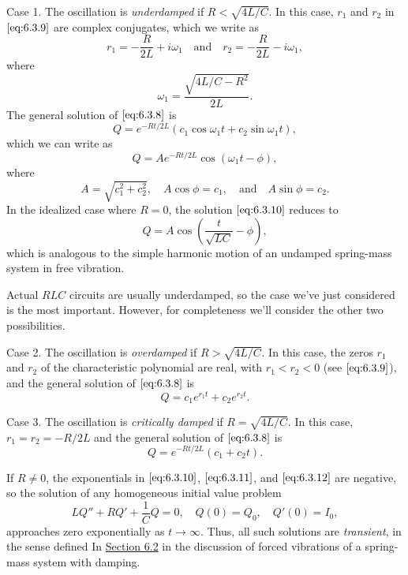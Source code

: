 \documentclass{ximera}
\begin{document}
Case 1.
The oscillation is \textit{underdamped} if $R<\sqrt{4L/C}$. In this
case, $r_1$ and $r_2$ in $\eqref{eq:6.3.9}$ are complex conjugates, which we
write as
$$
r_1=-\frac{R}{2L}+i\omega_1\quad\mbox{and}\quad r_2=-\frac{R}{2L}-i\omega_1,
$$
where
$$
\omega_1=\frac{\sqrt{4L/C-R^2}}{2L}.
$$
The general solution of  $\eqref{eq:6.3.8}$  is
$$
Q=e^{-Rt/2L}(c_1\cos\omega_1 t+c_2\sin\omega_1 t),
$$
which we can write as
\begin{equation}\label{eq:6.3.10}
Q=Ae^{-Rt/2L}\cos(\omega_1 t-\phi),
\end{equation}
 where
$$
A=\sqrt{c_1^2+c_2^2},\quad A\cos\phi=c_1,\quad\mbox{and}\quad A\sin\phi=c_2.
$$
In the idealized case where $R=0$, the solution $\eqref{eq:6.3.10}$
reduces to
$$
Q=A\cos\left(\frac{t}{\sqrt{LC}}-\phi\right),
$$
which is analogous to  the simple harmonic motion of an undamped
spring-mass system in free vibration.

Actual $RLC$ circuits are usually underdamped, so the case we've just
considered is the most important. However, for completeness we'll
consider the other two possibilities.

Case 2.
The oscillation is \textit{overdamped} if $R>\sqrt{4L/C}$. In this case,
the zeros $r_1$ and $r_2$ of the characteristic polynomial are real,
with $r_1<r_2<0$ (see $\eqref{eq:6.3.9}$), and the general solution of
$\eqref{eq:6.3.8}$ is
\begin{equation}\label{eq:6.3.11}
Q=c_1e^{r_1t}+c_2e^{r_2t}.
\end{equation}

Case 3.
The oscillation is \textit{critically damped} if $R=\sqrt{4L/C}$. In
this case, $r_1=r_2=-R/2L$ and the general solution of $\eqref{eq:6.3.8}$ is
\begin{equation}\label{eq:6.3.12}
Q=e^{-Rt/2L}(c_1+c_2t).
\end{equation}

If $R\neq 0$, the exponentials in $\eqref{eq:6.3.10}$, $\eqref{eq:6.3.11}$,
and
$\eqref{eq:6.3.12}$ are negative, so the solution of any homogeneous initial
value problem
$$
 LQ''+RQ'+\frac{1}{C}Q=0,\quad Q(0)=Q_0,\quad Q'(0)=I_0,
$$
approaches zero exponentially as $t\rightarrow\infty$. Thus, all such
solutions are \textit{transient}, in the sense defined
In \href{https://xerxes.ximera.org/differentialequations/main/springProblemsI/springProblemsII}{Section 6.2} in the discussion of forced vibrations of a
spring-mass system with damping.
\end{document}

